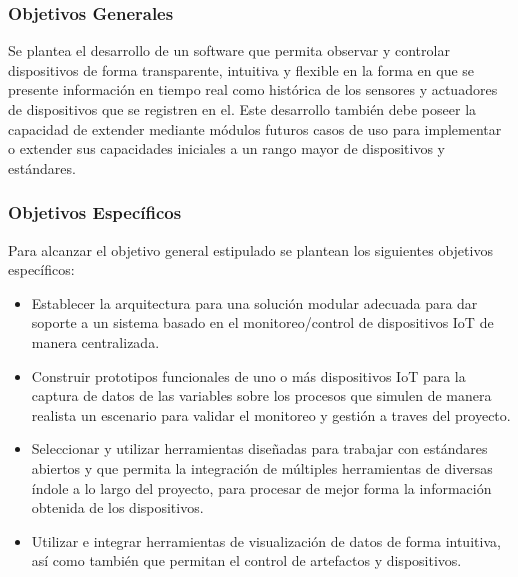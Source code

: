 \subsubsection{Objetivos Generales}
Se plantea el desarrollo de un software que permita observar y controlar dispositivos de forma transparente, intuitiva y flexible en la forma en que se presente información en tiempo real como histórica de los sensores y actuadores de dispositivos que se registren en el. Este desarrollo también debe poseer la capacidad de extender mediante módulos futuros casos de uso para implementar o extender sus capacidades iniciales a un rango mayor de dispositivos y estándares.

\subsubsection{Objetivos Específicos}
Para alcanzar el objetivo general estipulado se plantean los siguientes objetivos específicos:
\begin{itemize} 
\item Establecer la arquitectura para una solución modular adecuada para dar soporte a un sistema basado en el monitoreo/control de dispositivos IoT de manera centralizada.
\item Construir prototipos funcionales de uno o más dispositivos IoT para la captura de datos de las variables sobre los procesos que simulen de manera realista un escenario para validar el monitoreo y gestión a traves del proyecto.
\item Seleccionar y utilizar herramientas diseñadas para trabajar con estándares abiertos y que permita la integración de múltiples herramientas de diversas índole a lo largo del proyecto, para procesar de mejor forma la información obtenida de los dispositivos.
\item Utilizar e integrar herramientas de visualización de datos de forma intuitiva, así como también que permitan el control de artefactos y dispositivos.
\end{itemize}
